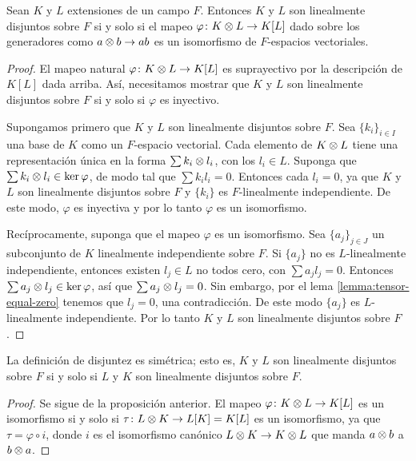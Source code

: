 \begin{proposition}\label{prop:2.3.2}
  Sean $K$ y $L$ extensiones de un campo $F$. Entonces $K$ y $L$ son linealmente disjuntos sobre $F$ si y solo si el mapeo $\varphi\colon K \otimes L \to K[L]$ dado sobre los generadores como $a \otimes b \to ab$ es un isomorfismo de $F$-espacios vectoriales.
\end{proposition}
\begin{proof}
  El mapeo natural $\varphi\colon K \otimes L \to K[L]$ es suprayectivo por la descripción de $K[L]$ dada arriba. Así, necesitamos mostrar que $K$ y $L$ son linealmente disjuntos sobre $F$ si y solo si $\varphi$ es inyectivo.

  Supongamos primero que $K$ y $L$ son linealmente disjuntos sobre $F$. Sea $\{k_i\}_{i\in I}$ una base de $K$ como un $F$-espacio vectorial. Cada elemento de $K \otimes L$ tiene una representación única en la forma $\sum k_i \otimes l_i$, con los $l_i \in L$. Suponga que $\sum k_i \otimes l_i \in \ker \varphi$, de modo tal que $\sum k_il_i = 0$. Entonces cada $l_i=0$, ya que $K$ y $L$ son linealmente disjuntos sobre $F$ y $\{k_i\}$ es $F$-linealmente independiente. De este modo, $\varphi$ es inyectiva y por lo tanto $\varphi$ es un isomorfismo.

  Recíprocamente, suponga que el mapeo $\varphi$ es un isomorfismo. Sea $\{a_j\}_{j\in J}$ un subconjunto de $K$ linealmente independiente sobre $F$. Si $\{a_j\}$ no es $L$-linealmente independiente, entonces existen $l_j \in L$ no todos cero, con $\sum a_j l_j=0$. Entonces $\sum a_j \otimes l_j \in \ker \varphi$, así que $\sum a_j \otimes l_j = 0$. Sin embargo, por el lema \ref{lemma:tensor-equal-zero} tenemos que $l_j=0$, una contradicción. De este modo $\{a_j\}$ es $L$-linealmente independiente. Por lo tanto $K$ y $L$ son linealmente disjuntos sobre $F$.
\end{proof}

\begin{corollary}
  La definición de disjuntez es simétrica; esto es, $K$ y $L$ son linealmente disjuntos sobre $F$ si y solo si $L$ y $K$ son linealmente disjuntos sobre $F$.
\end{corollary}
\begin{proof}
  Se sigue de la proposición anterior. El mapeo $\varphi\colon K \otimes L \to K[L]$ es un isomorfismo si y solo si $\tau\colon L \otimes K \to L[K] = K[L]$ es un isomorfismo, ya que $\tau = \varphi \circ i$, donde $i$ es el isomorfismo canónico $L \otimes K \to K \otimes L$ que manda $a \otimes b$ a $b \otimes a$.
\end{proof}

